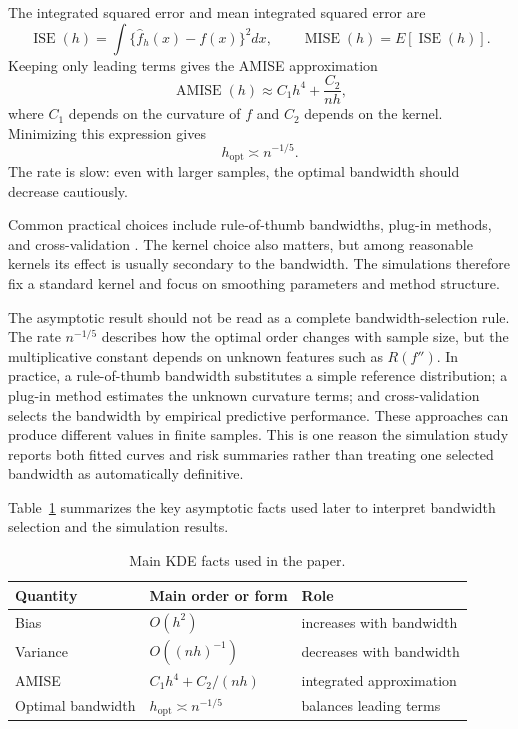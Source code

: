 \documentclass[12pt,a4paper]{article}
\begin{document}
The integrated squared error and mean integrated squared error are
\[
\operatorname{ISE}(h)=\int\{\hat f_h(x)-f(x)\}^2dx,
\qquad
\operatorname{MISE}(h)=E[\operatorname{ISE}(h)].
\]
Keeping only leading terms gives the AMISE approximation
\[
\operatorname{AMISE}(h)\approx C_1h^4+\frac{C_2}{nh},
\]
where \(C_1\) depends on the curvature of \(f\) and \(C_2\) depends on the kernel. Minimizing this expression gives
\[
h_{\mathrm{opt}}\asymp n^{-1/5}.
\]
The rate is slow: even with larger samples, the optimal bandwidth should decrease cautiously.

Common practical choices include rule-of-thumb bandwidths, plug-in methods, and cross-validation \citep{silverman1986density,scott2015multivariate,wand1995kernel}. The kernel choice also matters, but among reasonable kernels its effect is usually secondary to the bandwidth. The simulations therefore fix a standard kernel and focus on smoothing parameters and method structure.

The asymptotic result should not be read as a complete bandwidth-selection rule. The rate \(n^{-1/5}\) describes how the optimal order changes with sample size, but the multiplicative constant depends on unknown features such as \(R(f'')\). In practice, a rule-of-thumb bandwidth substitutes a simple reference distribution; a plug-in method estimates the unknown curvature terms; and cross-validation selects the bandwidth by empirical predictive performance. These approaches can produce different values in finite samples. This is one reason the simulation study reports both fitted curves and risk summaries rather than treating one selected bandwidth as automatically definitive.

Table~\ref{tab:kde-facts} summarizes the key asymptotic facts used later to interpret bandwidth selection and the simulation results.

\begin{table}[htbp]
\centering
\caption{Main KDE facts used in the paper.}
\label{tab:kde-facts}
\begin{tabular}{lll}
\toprule
Quantity & Main order or form & Role \\
\midrule
Bias & \(O(h^2)\) & increases with bandwidth \\
Variance & \(O((nh)^{-1})\) & decreases with bandwidth \\
AMISE & \(C_1h^4+C_2/(nh)\) & integrated approximation \\
Optimal bandwidth & \(h_{\mathrm{opt}}\asymp n^{-1/5}\) & balances leading terms \\
\bottomrule
\end{tabular}
\end{table}
\end{document}
